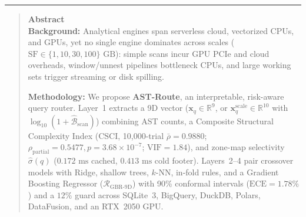 \documentclass[10pt,a4paper]{article}
\begin{document}
\noindent\rule{\textwidth}{0.8pt}
\begin{quote}
\small\sffamily
\textbf{\color{springerblue}Abstract}\\[0.3em]
\textbf{Background:} Analytical engines span serverless cloud, vectorized CPUs, and GPUs, yet no single engine dominates across scales ($\text{SF}\in\{1, 10, 30, 100\}\text{ GB}$): simple scans incur GPU PCIe and cloud overheads, window/unnest pipelines bottleneck CPUs, and large working sets trigger streaming or disk spilling.

\textbf{Methodology:} We propose \textbf{AST-Route}, an interpretable, risk-aware query router. Layer~1 extracts a 9D vector ($\mathbf{x}_q\in\mathbb{R}^9$, or $\mathbf{x}_q^{\text{scale}}\in\mathbb{R}^{10}$ with $\log_{10}(1+\hat{\mathcal{B}}_{\text{scan}})$) combining AST counts, a Composite Structural Complexity Index ($\text{CSCI}$, 10,000-trial $\bar{\rho}=0.9880$; $\rho_{\text{partial}}=0.5477, p=3.68\times 10^{-7}$; $\text{VIF}=1.84$), and zone-map selectivity $\hat{\sigma}(q)$ ($0.172\text{ ms}$ cached, $0.413\text{ ms}$ cold footer). Layers~2--4 pair crossover models with Ridge, shallow trees, $k$-NN, in-fold rules, and a Gradient Boosting Regressor ($\mathcal{R}_{\text{GBR-9D}}$) with 90\% conformal intervals ($\text{ECE}=1.78\%$) and a $12\%$ guard across SQLite~3, BigQuery, DuckDB, Polars, DataFusion, and an RTX~2050 GPU.


\end{quote}
\end{document}
